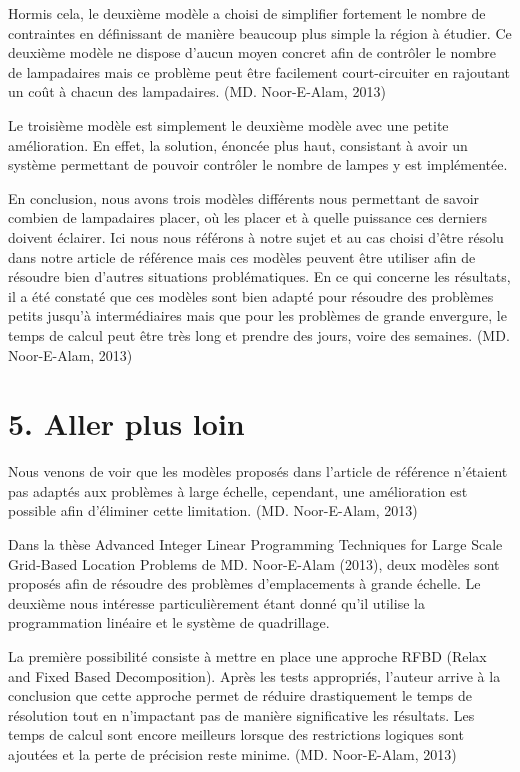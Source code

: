 Hormis cela, le deuxième modèle a choisi de simplifier fortement le nombre de contraintes en définissant de manière beaucoup plus simple la région à étudier. Ce deuxième modèle ne dispose d'aucun moyen concret afin de contrôler le nombre de lampadaires mais ce problème peut être facilement court-circuiter en rajoutant un coût à chacun des lampadaires. (MD. Noor-E-Alam, 2013)

\bigskip

Le troisième modèle est simplement le deuxième modèle avec une petite amélioration. En effet, la solution, énoncée plus haut, consistant à avoir un système permettant de pouvoir contrôler le nombre de lampes y est implémentée.

\bigskip

En conclusion, nous avons trois modèles différents nous permettant de savoir combien de lampadaires placer, où les placer et à quelle puissance ces derniers doivent éclairer. Ici nous nous référons à notre sujet et au cas choisi d'être résolu dans notre article de référence mais ces modèles peuvent être utiliser afin de résoudre bien d'autres situations problématiques. 
En ce qui concerne les résultats, il a été constaté que ces modèles sont bien adapté pour résoudre des problèmes petits jusqu'à intermédiaires mais que pour les problèmes de grande envergure, le temps de calcul peut être très long et prendre des jours, voire des semaines. (MD. Noor-E-Alam, 2013)


\section*{5. Aller plus loin}

\bigskip

Nous venons de voir que les modèles proposés dans l'article de référence n'étaient pas adaptés aux problèmes à large échelle, cependant,  une amélioration est possible afin d'éliminer cette limitation. (MD. Noor-E-Alam, 2013)

\bigskip

Dans la thèse Advanced Integer Linear Programming Techniques for Large Scale Grid-Based Location Problems de MD. Noor-E-Alam (2013), deux modèles sont proposés afin de résoudre des problèmes d'emplacements à grande échelle. Le deuxième nous intéresse particulièrement étant donné qu'il utilise la programmation linéaire et le système de quadrillage.

\bigskip

La première possibilité consiste à mettre en place une approche RFBD (Relax and Fixed Based Decomposition). Après les tests appropriés, l'auteur arrive à la conclusion que cette approche permet de réduire drastiquement le temps de résolution tout en n'impactant pas de manière significative les résultats. Les temps de calcul sont encore meilleurs lorsque des restrictions logiques sont ajoutées et la perte de précision reste minime. (MD. Noor-E-Alam, 2013) 

